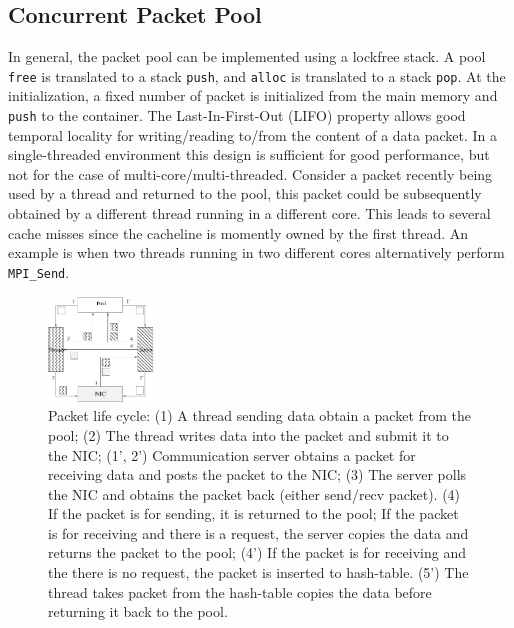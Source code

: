 \subsection{Concurrent Packet Pool}
In general, the packet pool can be implemented using a lockfree stack. A pool
\texttt{free} is translated to a stack \texttt{push}, and \texttt{alloc} is
translated to a stack \texttt{pop}. At the initialization, a fixed number of
packet is initialized from the main memory and \texttt{push} to the container.
The Last-In-First-Out (LIFO) property allows good temporal locality for
writing/reading to/from the content of a data packet. In a single-threaded
environment this design is sufficient for good performance, but not for the
case of multi-core/multi-threaded. Consider a packet recently being used by a thread
and returned to the pool, this packet could be subsequently obtained by a different thread
running in a different core. This leads to several cache misses since the cacheline
is momently owned by the first thread. An example is when two threads running in 
two different cores alternatively perform \texttt{MPI_Send}.

\begin{figure}[!h]
  \centering 
  \includegraphics[width=0.25\textwidth]{fig/packetlife.pdf}
  \caption{Packet life cycle: (1) A thread sending data obtain a packet from the
    pool; (2) The thread writes data into the packet and submit it to the NIC;
    (1', 2') Communication server obtains a packet for receiving data
    and posts the packet to the NIC;
    (3) The server polls the NIC and obtains the packet back (either send/recv packet).
    (4) If the packet is for sending, it is returned to the pool;
    If the packet is for receiving and there is a request, the server copies the data
    and returns the packet to the pool;
    (4') If the packet is for receiving and the there is no request, the packet is inserted to hash-table.
    (5') The thread takes packet from the hash-table copies the data before returning it back to the pool.}
  
  \label{fig:packetlife}
\end{figure}

